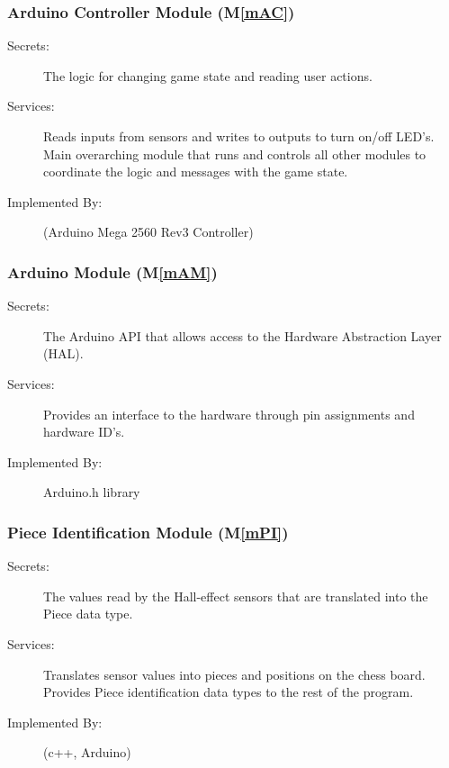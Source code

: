 \documentclass[12pt, titlepage]{article}
\newcommand{\mref}[1]{M\ref{#1}}
\begin{document}
\subsubsection{Arduino Controller Module (\mref{mAC})}
\begin{description}
\item[Secrets:] The logic for changing game state and reading user actions.
\item[Services:] Reads inputs from sensors and writes to outputs to turn on/off LED's. Main overarching module that runs and controls all other modules to coordinate the logic and messages with the game state.
\item[Implemented By:] \progname (Arduino Mega 2560 Rev3 Controller)
\end{description}

\subsubsection{Arduino Module (\mref{mAM})}
\begin{description}
\item[Secrets:] The Arduino API that allows access to the Hardware Abstraction Layer (HAL).
\item[Services:] Provides an interface to the hardware through pin assignments and hardware ID's.
\item[Implemented By:] Arduino.h library
\end{description}

\subsubsection{Piece Identification Module (\mref{mPI})}
\begin{description}
\item[Secrets:] The values read by the Hall-effect sensors that are translated into the Piece data type.
\item[Services:] Translates sensor values into pieces and positions on the chess board. Provides Piece identification data types to the rest of the program.
\item[Implemented By:] \progname (c++, Arduino)
\end{description}
\end{document}
